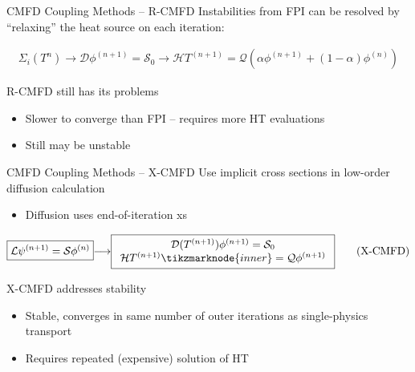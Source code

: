 \documentclass{beamer}
\begin{document}
\begin{frame}{CMFD Coupling Methods -- R-CMFD}
    Instabilities from FPI can be resolved by ``relaxing'' the heat source on each iteration:

    \begin{gather}
        \boxed{\Sigma_i(T^n)}{\longrightarrow}{\boxed{\mathcal{D}\phi^{(n+1)} = \mathcal{S}_{0}}} \longrightarrow  \boxed{\mathcal{H}T^{(n+1)} = \mathcal{Q}(\alpha\phi^{(n+1)} + (1-\alpha)\phi^{(n)})}\tag{R-CMFD}
    \end{gather}

    R-CMFD still has its problems
    \begin{itemize}
        \item Slower to converge than FPI -- requires more HT evaluations
        \item Still may be unstable
    \end{itemize}

    
\end{frame}

\begin{frame}{CMFD Coupling Methods -- X-CMFD}
    Use implicit cross sections in low-order diffusion calculation
    
    \begin{itemize}
        \item Diffusion uses end-of-iteration xs
    \end{itemize}

    \begin{equation}
        \boxed{\mathcal{L}\psi^{(n+1)} = \mathcal{S}\phi^{(n)}}{\longrightarrow}\boxed{\begin{array}{c}
            \mathcal{D}(T^{(n+1)})\phi^{(n+1)} = \mathcal{S}_{0}\\
            \mathcal{H}T^{(n+1)} \tikzmarknode{inner}= \mathcal{Q}\phi^{(n+1)}
        \end{array}}\tag{X-CMFD}
    \end{equation}

    X-CMFD addresses stability
    \begin{itemize}
        \item Stable, converges in same number of outer iterations as single-physics transport
        \item Requires repeated (expensive) solution of HT
    \end{itemize}

\end{frame}
\end{document}
